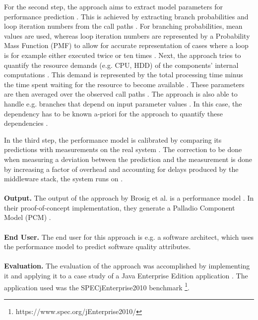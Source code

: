 For the second step, the approach aims to extract model parameters for performance prediction \cite{Brosig2011}.
This is achieved by extracting branch probabilities and loop iteration numbers from the call paths \cite{Brosig2011}.
For branching probabilities, mean values are used, whereas loop iteration numbers are represented by a Probability Mass Function (PMF) to allow for accurate representation of cases where a loop is for example either executed twice or ten times \cite{Brosig2011}.
Next, the approach tries to quantify the resource demands (e.g. CPU, HDD) of the components' internal computations \cite{Brosig2011}.
This demand is represented by the total processing time minus the time spent waiting for the resource to become available \cite{Brosig2011}.
These parameters are then averaged over the observed call paths \cite{Brosig2011}.
The approach is also able to handle e.g. branches that depend on input parameter values \cite{Brosig2011}.
In this case, the dependency has to be known a-priori for the approach to quantify these dependencies \cite{Brosig2011}.

In the third step, the performance model is calibrated by comparing its predictions with measurements on the real system \cite{Brosig2011}.
The correction to be done when measuring a deviation between the prediction and the measurement is done by increasing a factor of overhead and accounting for delays produced by the middleware stack, the system runs on \cite{Brosig2011}.
\\ \\
\textbf{Output.}
The output of the approach by Brosig et al. is a performance model \cite{Brosig2011}.
In their proof-of-concept implementation, they generate a Palladio Component Model (PCM) \cite{Brosig2011}.
\\ \\
\textbf{End User.}
The end user for this approach is e.g. a software architect, which uses the performance model to predict software quality attributes.
\\ \\
\textbf{Evaluation.}
The evaluation of the approach was accomplished by implementing it and applying it to a case study of a Java Enterprise Edition application \cite{Brosig2011}.
The application used was the SPECjEnterprise2010 benchmark \footnote{https://www.spec.org/jEnterprise2010/}.


